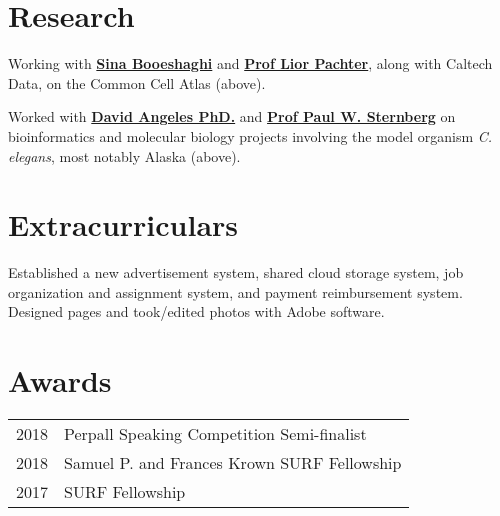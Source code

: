 \documentclass[]{resume}
\begin{document}
\begin{minipage}[t]{0.66\textwidth}
\section{Research}
Working with \textbf{\href{https://sinabooeshaghi.com/}{Sina Booeshaghi}} and \textbf{\href{https://pachterlab.github.io/biography.html}{Prof Lior Pachter}}, along with Caltech Data, on the Common Cell Atlas (above).
\sectionsep

Worked with \textbf{\href{https://dangeles.github.io/}{David Angeles PhD.}} and \textbf{\href{http://wormlab.caltech.edu/LabMembers/Paul}{Prof Paul W. Sternberg}} on bioinformatics and molecular biology projects involving the model organism \textit{C. elegans}, most notably Alaska (above).
\sectionsep


\section{Extracurriculars}
Established a new advertisement system, shared cloud storage system, job organization and assignment system, and payment reimbursement system. Designed pages and took/edited photos with Adobe software.
\sectionsep


\section{Awards}
\begin{tabular}{rl}
2018     & Perpall Speaking Competition Semi-finalist \\
2018     & Samuel P. and Frances Krown SURF Fellowship  \\
2017     & SURF Fellowship \\
\end{tabular}
\sectionsep


% 
% 

\end{minipage}
\end{document}
